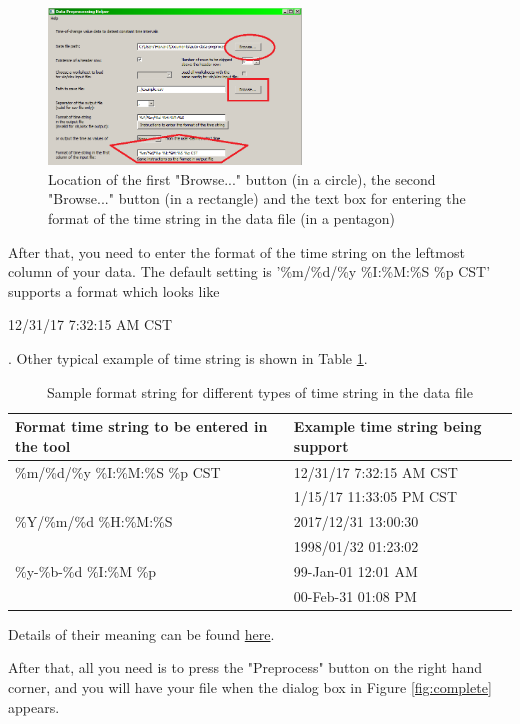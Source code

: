\documentclass[12pt,a4paper]{article}
\begin{document}
\begin{figure}[H]
\centering
\includegraphics[width=0.6\textwidth]{ui_zoomed.png}
\caption{Location of the first "Browse..." button (in a circle), the second "Browse..." button (in a rectangle) and the text box for entering the format of the time string in the data file (in a pentagon)}
\label{fig:ui_zoomed}
\end{figure}

After that, you need to enter the format of the time string on the leftmost column of your data. The default setting is '\%m/\%d/\%y \%I:\%M:\%S \%p CST' supports a format which looks like

12/31/17 7:32:15 AM CST

. Other typical example of time string is shown in Table \ref{tb:sample_timestring}.

\begin{table}[H]
\caption{Sample format string for different types of time string in the data file}
\begin{tabular}{|p{6cm}|l|}
\hline
Format time string to be entered in the tool & Example time string being support \\ \hline
\%m/\%d/\%y \%I:\%M:\%S \%p CST & 12/31/17 7:32:15 AM CST  \\
 & 1/15/17 11:33:05 PM CST \\ \hline
\%Y/\%m/\%d \%H:\%M:\%S & 2017/12/31 13:00:30  \\
 & 1998/01/32 01:23:02 \\ \hline
 \%y-\%b-\%d \%I:\%M \%p & 99-Jan-01 12:01 AM \\
 & 00-Feb-31 01:08 PM \\ \hline
\end{tabular}
\label{tb:sample_timestring}
\end{table}

Details of their meaning can be found \href{https://docs.python.org/3.5/library/datetime.html\#strftime-and-strptime-behavior}{here}.

After that, all you need is to press the "Preprocess" button on the right hand corner, and you will have your file when the dialog box in Figure \ref{fig:complete} appears.
\end{document}
